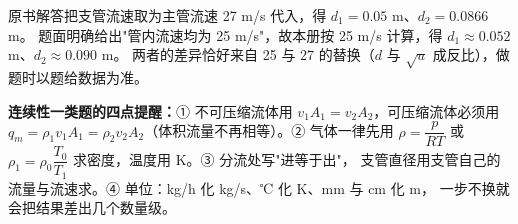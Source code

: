 \begin{tishi}
原书解答把支管流速取为主管流速 27 m/s 代入，得 $d_1=0.05$ m、$d_2=0.0866$ m。
题面明确给出"管内流速均为 25 m/s"，故本册按 25 m/s 计算，得 $d_1\approx0.052$ m、$d_2\approx0.090$ m。
两者的差异恰好来自 25 与 27 的替换（$d$ 与 $\sqrt{u}$ 成反比），做题时以题给数据为准。
\end{tishi}

\begin{yicuo}
\textbf{连续性一类题的四点提醒：}① 不可压缩流体用 $v_1A_1=v_2A_2$，可压缩流体必须用
$q_m=\rho_1v_1A_1=\rho_2v_2A_2$（体积流量不再相等）。② 气体一律先用 $\rho=\dfrac{p}{RT}$ 或
$\rho_1=\rho_0\dfrac{T_0}{T_1}$ 求密度，温度用 K。③ 分流处写"进等于出"，
支管直径用支管自己的流量与流速求。④ 单位：kg/h 化 kg/s、℃ 化 K、mm 与 cm 化 m，
一步不换就会把结果差出几个数量级。
\end{yicuo}
